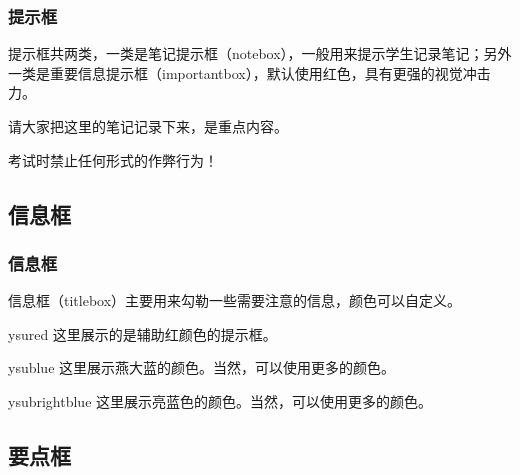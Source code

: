 \documentclass[aspectratio=169,UTF8,t]{beamer}%
\begin{document}
\begin{frame}
    \frametitle{提示框}
    提示框共两类，一类是笔记提示框（notebox），一般用来提示学生记录笔记；另外一类是重要信息提示框（importantbox），默认使用红色，具有更强的视觉冲击力。
      \begin{notebox}[笔记]
        请大家把这里的笔记记录下来，是重点内容。 
      \end{notebox}
      \begin{importantbox}[重要]
        考试时禁止任何形式的作弊行为！
      \end{importantbox}              
\end{frame}

\subsection{信息框}

\begin{frame}
    \frametitle{信息框}
    信息框（titlebox）主要用来勾勒一些需要注意的信息，颜色可以自定义。
    \begin{titlebox}[提示框]{ysured}
        这里展示的是辅助红颜色的提示框。
      \end{titlebox}
      \begin{titlebox}[颜色展示]{ysublue}
        这里展示燕大蓝的颜色。当然，可以使用更多的颜色。 
      \end{titlebox}
      \begin{titlebox}[另外一些颜色的显示]{ysubrightblue}
        这里展示亮蓝色的颜色。当然，可以使用更多的颜色。 
      \end{titlebox}    
\end{frame}

\subsection{要点框}
\end{document}
